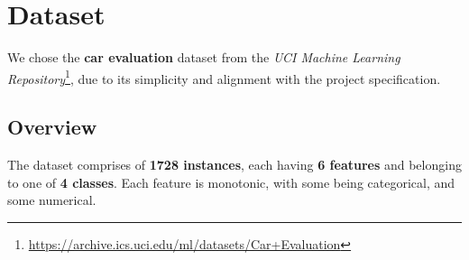 \documentclass[../main.tex]{subfiles}
\begin{document}
\section{Dataset}
We chose the \textbf{car evaluation} dataset from the \emph{UCI Machine
Learning
Repository}\footnote{\url{https://archive.ics.uci.edu/ml/datasets/Car+Evaluation}},
due to its simplicity and alignment with the project specification.

\subsection{Overview}
The dataset comprises of \textbf{1728 instances}, each having \textbf{6
features} and belonging to one of \textbf{4 classes}. Each feature is
monotonic, with some being categorical, and some numerical.
\end{document}
